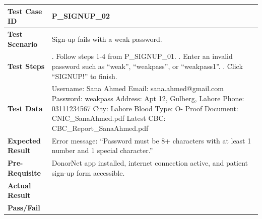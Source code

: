 \documentclass[11pt]{article}
\begin{document}
\noindent
\begin{tabularx}{\textwidth}{|>{\raggedright\arraybackslash}p{}|>{\raggedright\arraybackslash}X|}
\hline
\textbf{Test Case ID} & P\_SIGNUP\_02 \\
\hline
\textbf{Test Scenario} & Sign-up fails with a weak password. \\
\hline
\textbf{Test Steps} & 1. Follow steps 1-4 from P\_SIGNUP\_01. \newline
2. Enter an invalid password such as ``weak'', ``weakpass'', or ``weakpass1''. \newline
3. Click ``SIGNUP!'' to finish. \\
\hline
\textbf{Test Data} & Username: Sana Ahmed \newline
Email: sana.ahmed@gmail.com \newline
Password: weakpass \newline
Address: Apt 12, Gulberg, Lahore \newline
Phone: 03111234567 \newline
City: Lahore \newline
Blood Type: O- \newline
Proof Document: CNIC\_SanaAhmed.pdf \newline
Latest CBC: CBC\_Report\_SanaAhmed.pdf \\
\hline
\textbf{Expected Result} & Error message: ``Password must be 8+ characters with at least 1 number and 1 special character.'' \\
\hline
\textbf{Pre-Requisite} & DonorNet app installed, internet connection active, and patient sign-up form accessible. \\
\hline
\textbf{Actual Result} &  \\
\hline
\textbf{Pass/Fail} &  \\
\hline
\end{tabularx}
\vspace{1em}
\end{document}
